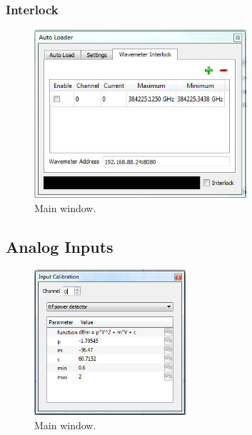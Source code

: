 \documentclass{scrartcl}
\begin{document}
\subsubsection{Interlock}
\begin{figure}[htbp]
\begin{center}
\includegraphics[width=0.7\textwidth]{WavemeterInterlock}
\end{center}
\caption{\label{WavemeterInterlock} Main window.}
\end{figure}

\subsection{Analog Inputs}
\begin{figure}[htbp]
\begin{center}
\includegraphics[width=0.5\textwidth]{AnalogInputCalibration}
\end{center}
\caption{\label{WavemeterInterlock} Main window.}
\end{figure}
\end{document}
